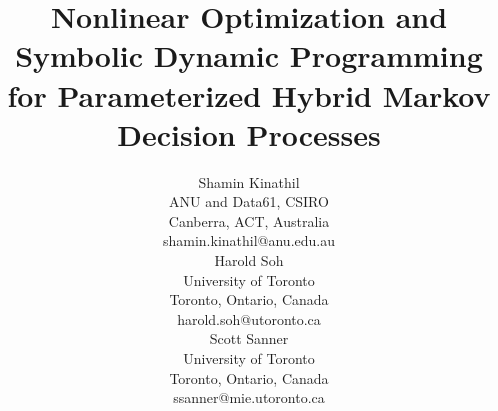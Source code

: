 \title{Nonlinear Optimization and Symbolic Dynamic Programming for Parameterized Hybrid Markov Decision Processes}

\author{Shamin Kinathil \\
ANU and Data61, CSIRO \\
Canberra, ACT, Australia \\
shamin.kinathil@anu.edu.au \\
\And
Harold Soh \\
University of Toronto \\
Toronto, Ontario, Canada \\
harold.soh@utoronto.ca \\
\And
Scott Sanner  \\
University of Toronto \\
Toronto, Ontario, Canada \\
ssanner@mie.utoronto.ca \\
}

\maketitle